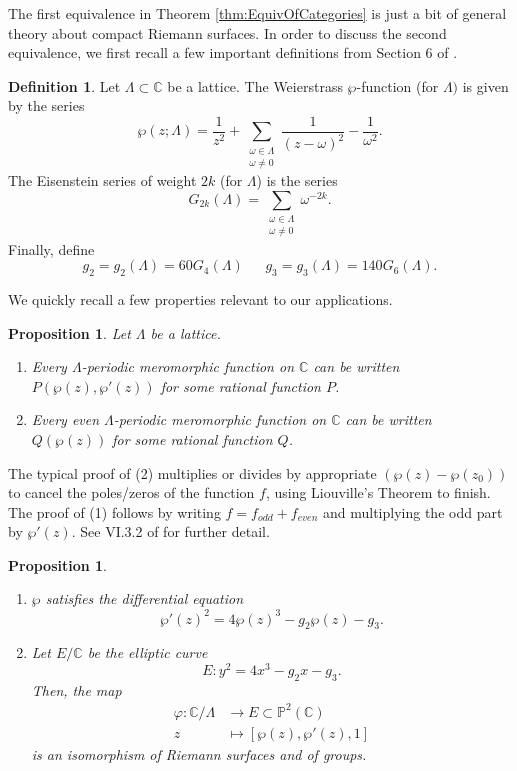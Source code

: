 \documentclass{amsart}
\newtheorem{prop}[thm]{Proposition}
\theoremstyle{definition}
\newtheorem{definition}[thm]{Definition}
\theoremstyle{remark}
\numberwithin{equation}{section}
\newcommand{\bbC}{\mathbb C}
\newcommand{\bbP}{\mathbb P}
\begin{document}

The first equivalence in Theorem \ref{thm:EquivOfCategories} is just a bit of general theory about compact Riemann surfaces. In order to discuss the second equivalence, we first recall a few important definitions from Section 6 of \cite{SilvermanAEC}.

\begin{definition}
Let $\Lambda \subset \bbC$ be a lattice. The Weierstrass $\wp$-function (for $\Lambda)$ is given by the series
\[ 
  \wp(z; \Lambda) = \frac{1}{z^2} + \sum_{\substack{\omega \in \Lambda\\  \omega \neq 0}}\frac{1}{(z - \omega)^2} - \frac{1}{\omega^2}.
  \] 
The Eisenstein series of weight $2k$ (for $\Lambda$) is the series
\[
 G_{2k}(\Lambda) = \sum_{\substack{\omega \in \Lambda\\  \omega \neq 0}} \omega^{-2k}.
\]
Finally, define 
\[
 g_{2} = g_{2}(\Lambda) = 60 G_4(\Lambda) \ \ \ \ \ \ \ 
 g_{3} = g_{3}(\Lambda) = 140 G_{6}(\Lambda).
\]
\end{definition}

 We quickly recall a few properties relevant to our applications.
 
 \begin{prop} \label{prop:LatticesAndWp}
 Let $\Lambda$ be a lattice. 
 \begin{enumerate}
 \item Every $\Lambda$-periodic meromorphic function on $\bbC$ can be written $P(\wp(z), \wp'(z))$ for some rational function $P$. 
 \item Every even $\Lambda$-periodic meromorphic function on $\bbC$ can be written $Q(\wp(z))$ for some rational function $Q$.
 \end{enumerate}
 \end{prop}
 
 The typical proof of (2) multiplies or divides by appropriate $(\wp(z) - \wp(z_{0}))$ to cancel the poles/zeros of the function $f$, using Liouville's Theorem to finish. The proof of (1) follows by writing $f = f_{odd} + f_{even}$ and multiplying the odd part by $\wp'(z)$. See VI.3.2 of \cite{SilvermanAEC} for further detail.
 
 
 \begin{prop} \label{prop:LatticeIsCurve}
 \begin{enumerate}
 \item $\wp$ satisfies the differential equation
 \[
 \wp'(z)^2 = 4 \wp(z)^3 - g_2 \wp(z) - g_3.
 \]
 
 \item Let $E/\bbC$ be the elliptic curve 
 \[
 E: y^2 = 4 x^3 - g_2 x - g_3.
 \] 
 Then, the map 
 \begin{align*}
  \varphi: \bbC/\Lambda & \to E \subset \bbP^2(\bbC) \\
                z      & \mapsto [\wp(z), \wp'(z), 1]
 \end{align*}
 is an isomorphism of Riemann surfaces and of groups. 
 \end{enumerate}
 \end{prop}
 
\end{document}
